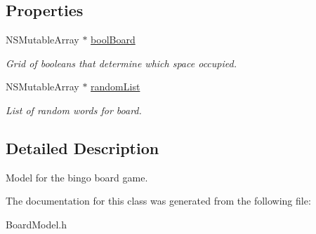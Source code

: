 \subsection*{Properties}
\begin{DoxyCompactItemize}
\item 
\hypertarget{interface_board_model_a7c63e201829243984f5b4356d76259be}{N\+S\+Mutable\+Array $\ast$ \hyperlink{interface_board_model_a7c63e201829243984f5b4356d76259be}{bool\+Board}}\label{interface_board_model_a7c63e201829243984f5b4356d76259be}

\begin{DoxyCompactList}\small\item\em Grid of booleans that determine which space occupied. \end{DoxyCompactList}\item 
\hypertarget{interface_board_model_a5a0e52c2bf6346dcaa464039212047b9}{N\+S\+Mutable\+Array $\ast$ \hyperlink{interface_board_model_a5a0e52c2bf6346dcaa464039212047b9}{random\+List}}\label{interface_board_model_a5a0e52c2bf6346dcaa464039212047b9}

\begin{DoxyCompactList}\small\item\em List of random words for board. \end{DoxyCompactList}\end{DoxyCompactItemize}


\subsection{Detailed Description}
Model for the bingo board game. 

The documentation for this class was generated from the following file\+:\begin{DoxyCompactItemize}
\item 
Board\+Model.\+h\end{DoxyCompactItemize}
